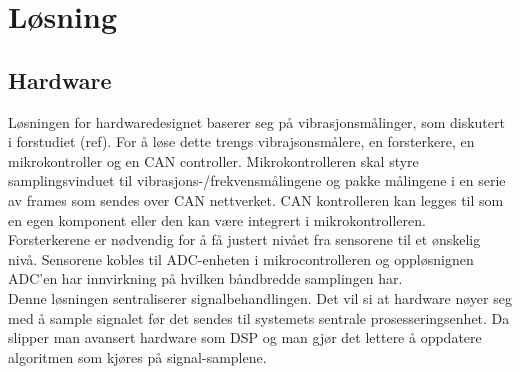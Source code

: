 \chapter{Løsning}



\section{Hardware}

Løsningen for hardwaredesignet baserer seg på vibrasjonsmålinger, som diskutert
i forstudiet (ref). For å løse dette trengs vibrajsonsmålere, en forsterkere,
en mikrokontroller og en CAN controller. Mikrokontrolleren skal styre
samplingsvinduet til vibrasjons-/frekvensmålingene og pakke målingene i en serie
av frames som sendes over CAN nettverket. CAN kontrolleren kan legges til som en
egen komponent eller den kan være integrert i mikrokontrolleren. Forsterkerene er
nødvendig for å få justert nivået fra sensorene til et ønskelig nivå. Sensorene
kobles til ADC-enheten i mikrocontrolleren og oppløsnignen ADC'en
har innvirkning på hvilken båndbredde samplingen har. \\

Denne løsningen sentraliserer signalbehandlingen. Det vil si at hardware nøyer
seg med å sample signalet før det sendes til systemets sentrale
prosesseringsenhet. Da slipper man avansert hardware som DSP og man gjør det
lettere å oppdatere algoritmen som kjøres på signal-samplene.
